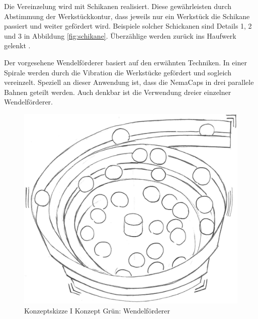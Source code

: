 \vspace{0.6cm}

Die Vereinzelung wird mit Schikanen realisiert. Diese gewährleisten durch Abstimmung der Werkstückkontur, dass jeweils nur ein Werkstück die Schikane passiert und weiter gefördert wird. Beispiele solcher Schickanen sind Details 1, 2 und 3 in Abbildung \ref{fig:schikane}. Überzählige werden zurück ins Haufwerk gelenkt \cite{handling_online}.
\newline

Der vorgesehene Wendelförderer basiert auf den erwähnten Techniken. In einer Spirale werden durch die Vibration die Werkstücke gefördert und sogleich vereinzelt. Speziell an dieser Anwendung ist, dass die NemaCaps in drei parallele Bahnen geteilt werden. Auch denkbar ist die Verwendung dreier einzelner Wendelförderer.

\begin{figure}[H]
	\includegraphics[scale=0.6]{Illustrationen/5-Konzept/green_wendelfoerderer.jpg}
	\caption{Konzeptskizze I Konzept Grün: Wendelförderer}
	\label{fig:vereinzelung_green}
\end{figure}

